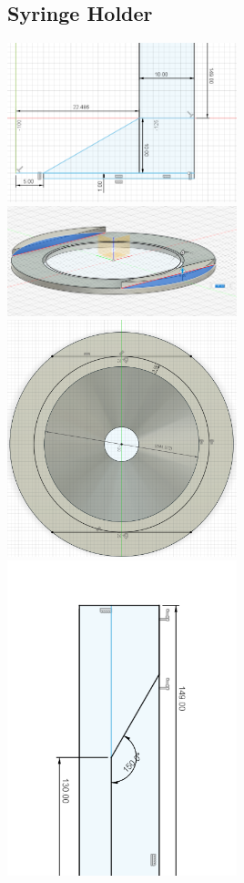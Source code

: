 \subsection{Syringe Holder}
\includegraphics[width=0.5\textwidth]{3dprints/syringe_holder_side.png}
\includegraphics[width=0.5\textwidth]{3dprints/syringe_holder_top.png}
\includegraphics[width=0.5\textwidth]{3dprints/syringe_holder_top_2.png}
\includegraphics[width=0.5\textwidth]{3dprints/syringe_holder_side_top2.png}

